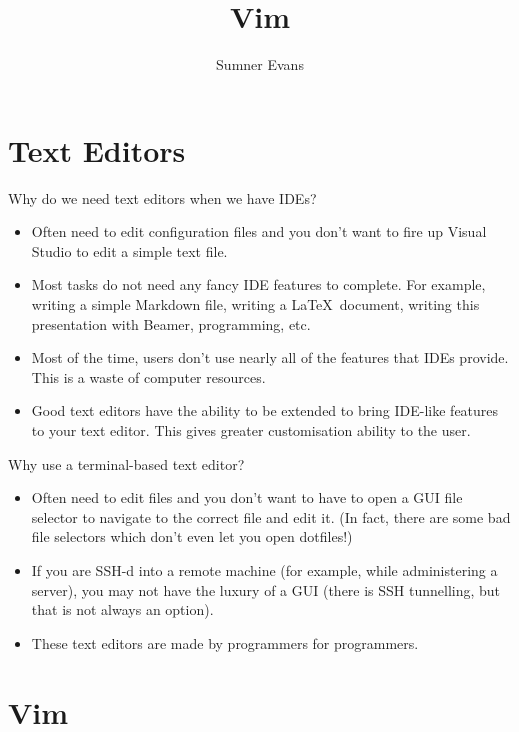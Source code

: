 \documentclass{lug}
\title{Vim}
\author{Sumner Evans}
\institute{Mines Linux Users Group}
\begin{document}
\section{Text Editors}
\begin{frame}{Why do we need text editors when we have IDEs?}
    \begin{itemize}[<+->]
        \item Often need to edit configuration files and you don't want to fire
            up Visual Studio to edit a simple text file.
        \item Most tasks do not need any fancy IDE features to complete.  For
            example, writing a simple Markdown file, writing a \LaTeX\ document,
            writing this presentation with Beamer, programming, etc.
        \item Most of the time, users don't use nearly all of the features that
            IDEs provide. This is a waste of computer resources.
        \item Good text editors have the ability to be extended to bring
            IDE-like features to your text editor. This gives greater
            customisation ability to the user.
    \end{itemize}
\end{frame}

\begin{frame}{Why use a terminal-based text editor?}
    \begin{itemize}[<+->]
        \item Often need to edit files and you don't want to have to open a GUI
            file selector to navigate to the correct file and edit it. (In fact,
            there are some bad file selectors which don't even let you open
            dotfiles!)

        \item If you are SSH-d into a remote machine (for example, while
            administering a server), you may not have the luxury of a GUI (there
            is SSH tunnelling, but that is not always an option).

        \item These text editors are made by programmers for programmers.
    \end{itemize}
\end{frame}

\section{Vim}
\end{document}
